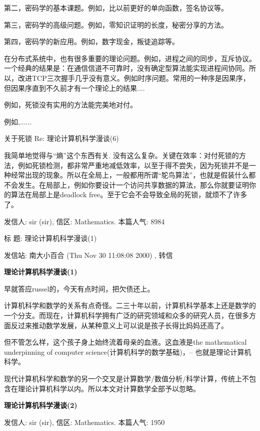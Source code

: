 第二，密码学的基本课题。例如，比以前更好的单向函数，签名协议等。 

第三，密码学的高级问题。例如，零知识证明的长度，秘密分享的方法。 

第四，密码学的新应用。例如，数字现金，叛徒追踪等。 

在分布式系统中，也有很多重要的理论问题。例如，进程之间的同步，互斥协议。一个经典的结果是：在通信信道不可靠时，没有确定型算法能实现进程间协同。所以，改进TCP三次握手几乎没有意义。例如时序问题。常用的一种序是因果序，但因果序直到不久前才有一个理论上的结果.... 

例如，死锁没有实用的方法能完美地对付。  

例如,...... 

  

关于死锁 Re: 理论计算机科学漫谈(6) 
  

我简单地觉得与“熵”这个东西有关. 没有这么复杂。关键在效率：对付死锁的方法，例如死锁检测，都非常严重地减低效率，以至于得不尝失，因为死锁并不是一种经常出现的现象。所以在全局上，一般都用所谓“鸵鸟算法”，也就是假装什么都不会发生。在局部上，例如你要设计一个访问共享数据的算法，那么你就要证明你的算法在局部上是deadlock free。至于它会不会导致全局的死锁，就烦不了许多了。 





发信人: sir (sir), 信区: Mathematics. 本篇人气: 8984

标  题: 理论计算机科学漫谈(1)\cite{tcs1}

发信站: 南大小百合 (Thu Nov 30 11:08:08 2000) , 转信

\textbf{理论计算机科学漫谈(1)}



早就答应russel的，今天有点时间，把欠债还上。

计算机科学和数学的关系有点奇怪。二三十年以前，计算机科学基本上还是数学的一个分支。而现在，计算机科学拥有广泛的研究领域和众多的研究人员，在很多方面反过来推动数学发展，从某种意义上可以说是孩子长得比妈妈还高了。

但不管怎么样，这个孩子身上始终流着母亲的血液。这血液是the mathematical underpinning of computer science(计算机科学的数学基础)，-- 也就是理论计算机科学。

现代计算机科学和数学的另一个交叉是计算数学/数值分析/科学计算，传统上不包含在理论计算机科学以内。所以本文对计算数学全部予以忽略。

\textbf{理论计算机科学漫谈(2)}

发信人: sir (sir), 信区: Mathematics. 本篇人气: 1950

